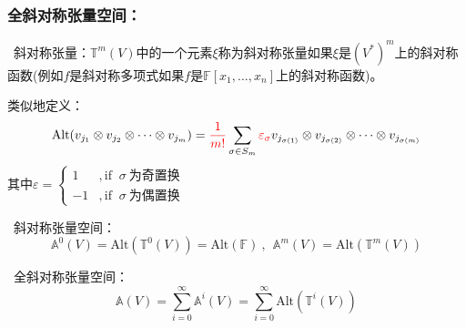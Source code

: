 \documentclass[zihao=-4,UTF8]{report}
\def\F{\mathbb{F}}
\def\T{\mathbb{T}}
\theoremstyle{mystyle} %
\begin{document}
\subsubsection{全斜对称张量空间：}
\par{}\ 斜对称张量：$\T^m(V)$中的一个元素$\xi$称为斜对称张量如果$\xi$是$(V^*)^m$上的斜对称函数(例如$f$是斜对称多项式如果$f$是$\F[x_1,...,x_n]$上的斜对称函数)。
{\par\color{gray}\small
类似地定义：
\begin{equation*}
    \text{Alt}(v_{j_1} \otimes v_{j_2} \otimes\cdots \otimes v_{j_m}) =  {\color{red}\frac{1}{m!}}\sum_{\sigma\in S_m}{\color{red}\varepsilon_{\sigma}}v_{j_{\sigma(1)}} \otimes v_{j_{\sigma(2)}} \otimes\cdots \otimes v_{j_{\sigma(m)}}
\end{equation*}   
其中$\varepsilon=\begin{cases}
    1 &, \text{if }\  \sigma\ \text{为奇置换}\\
    -1 &, \text{if }\  \sigma\ \text{为偶置换}
\end{cases}$
\par}

\par
{}\  斜对称张量空间：
\begin{equation*}
    \mathbb{A}^0(V) = \text{Alt}(\T^0(V)) = \text{Alt}(\F) \ ,\ \ \mathbb{A}^m(V) = \text{Alt}(\T^m(V))
\end{equation*}

\par
{}\  全斜对称张量空间：
\begin{equation*}
    \mathbb{A}(V) = \sum_{i=0}^{\infty} \mathbb{A}^i(V) = \sum_{i=0}^{\infty}\text{Alt}(\T^i(V))
\end{equation*}   \par



\nocite{*}

\thispagestyle{fancy} 
\end{document}
